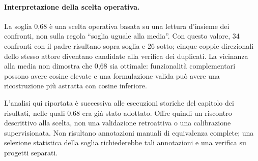 \paragraph{Interpretazione della scelta operativa.}
La soglia 0,68 è una scelta operativa basata su una lettura d'insieme dei
confronti, non sulla regola ``soglia uguale alla media''. Con questo valore,
34 confronti con il padre risultano sopra soglia e 26 sotto; cinque coppie
direzionali dello stesso attore diventano candidate alla verifica dei duplicati.
La vicinanza alla media non dimostra che 0,68 sia ottimale: funzionalità
complementari possono avere cosine elevate e una formulazione valida può
avere una ricostruzione più astratta con cosine inferiore.

L'analisi qui riportata è successiva alle esecuzioni storiche del capitolo
dei risultati, nelle quali 0,68 era già stato adottato. Offre quindi un
riscontro descrittivo alla scelta, non una validazione retroattiva o una
calibrazione supervisionata. Non risultano annotazioni manuali di equivalenza
complete; una selezione statistica della soglia richiederebbe tali annotazioni
e una verifica su progetti separati.

